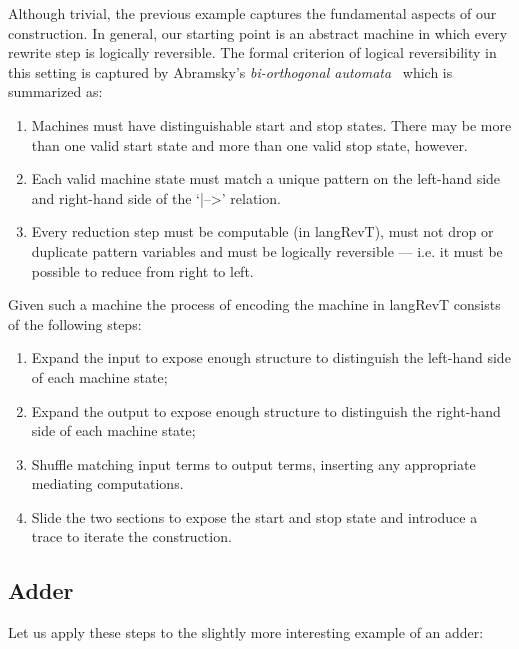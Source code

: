 \documentclass{llncs}
\begin{document}
Although trivial, the previous example captures the fundamental aspects of
our construction. In general, our starting point is an abstract machine in
which every rewrite step is logically reversible. The formal criterion of
logical reversibility in this setting is captured by Abramsky's
\emph{bi-orthogonal automata}~\cite[Sec.~2]{abramsky2005structural} which is
summarized as:
\begin{enumerate}
\item
  Machines must have distinguishable start and stop states. There may
  be more than one valid start state and more than one valid stop
  state, however.
\item Each valid machine state must match a unique pattern on the
  left-hand side and right-hand side of the `{{|-->}}' relation.
\item Every reduction step must be computable (in {{langRevT}}), must
  not drop or duplicate pattern variables and must be logically
  reversible --- i.e. it must be possible to reduce from right to
  left.
\end{enumerate}
Given such a machine the process of encoding the machine in {{langRevT}}
consists of the following steps:
\begin{enumerate}
\item Expand the input to expose enough structure to distinguish the
  left-hand side of each machine state;
\item Expand the output to expose enough structure to distinguish the
  right-hand side of each machine state;
\item Shuffle matching input terms to output terms, inserting any appropriate
  mediating computations. 
\item Slide the two sections to expose the start and stop state and
  introduce a {{trace}} to iterate the construction. 
\end{enumerate}

\subsection{Adder} 
\label{sec:adder}

Let us apply these steps to the slightly more interesting example of an
adder:

\vspace{-20pt}
\begin{small}
\begin{multicols}{2}  

\end{multicols}
\vspace{-15pt}
\end{small}
\end{document}
